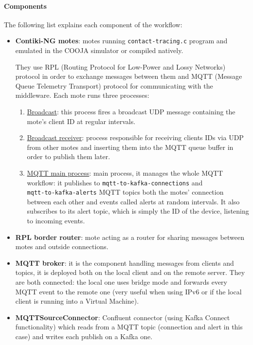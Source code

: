\documentclass[table, 12pt]{article}
\begin{document}
\paragraph{Components}
The following list explains each component of the workflow:
\begin{itemize}
    \item \textbf{Contiki-NG motes}: motes running \texttt{contact-tracing.c} program and emulated in the COOJA simulator or compiled natively.

          They use RPL (Routing Protocol for Low-Power and Lossy Networks) protocol in order to exchange messages between them and MQTT (Message Queue Telemetry Transport) protocol for communicating with the middleware.
          Each mote runs three processes:
          \begin{enumerate}
              \item \underline{Broadcast}: this process fires a broadcast UDP message containing the mote's client ID at regular intervals.
              \item \underline{Broadcast receiver}: process responsible for receiving clients IDs via UDP from other motes and inserting them into the MQTT queue buffer in order to publish them later.
              \item \underline{MQTT main process}: main process, it manages the whole MQTT workflow: it publishes to \texttt{mqtt-to-kafka-connections} and \\ \texttt{mqtt-to-kafka-alerts} MQTT topics both the motes' connection between each other and events called alerts at random intervals. It also subscribes to its alert topic, which is simply the ID of the device, listening to incoming events.
          \end{enumerate}
    \item \textbf{RPL border router}: mote acting as a router for sharing messages between motes and outside connections.
    \item \textbf{MQTT broker}: it is the component handling messages from clients and topics, it is deployed both on the local client and on the remote server. They are both connected: the local one uses bridge mode and forwards every MQTT event to the remote one (very useful when using IPv6 or if the local client is running into a Virtual Machine).
    \item \textbf{MQTTSourceConnector}: Confluent connector (using Kafka Connect functionality) which reads from a MQTT topic (connection and alert in this case) and writes each publish on a Kafka one.

\end{itemize}
\end{document}
